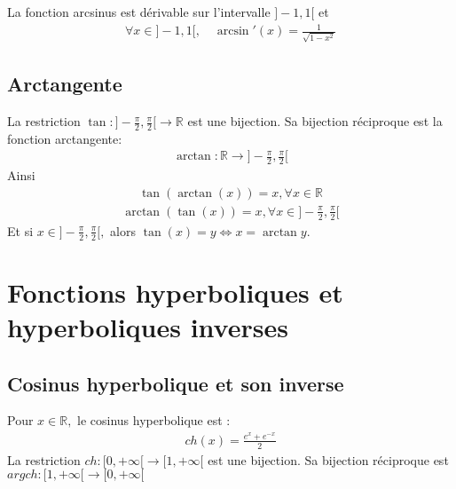 \documentclass[letterpaper,10pt,french]{jupyterBook}
\begin{document}
\sphinxAtStartPar
La fonction arcsinus est dérivable sur l’intervalle \(]-1,1[\) et
\begin{equation*}
\begin{split}
\forall x\in ]-1,1[,\quad \arcsin'(x)=\frac{1}{\sqrt{1-x^2}}
\end{split}
\end{equation*}

\subsection{Arctangente}
\label{\detokenize{fcthycerinvs:arctangente}}
\sphinxAtStartPar
La restriction \(\tan:]-\frac{\pi}{2},\frac{\pi}{2}[\rightarrow\mathbb{R}\) est une bijection. Sa bijection réciproque est la fonction arctangente:
\begin{equation*}
\begin{split}
\arctan:\mathbb{R}\rightarrow]-\frac{\pi}{2},\frac{\pi}{2}[
\end{split}
\end{equation*}
\sphinxAtStartPar
Ainsi
\begin{equation*}
\begin{split}
\tan(\arctan(x))=x,\forall x\in \mathbb{R}
\end{split}
\end{equation*}\begin{equation*}
\begin{split}
\arctan(\tan(x))=x, \forall x\in]-\frac{\pi}{2},\frac{\pi}{2}[
\end{split}
\end{equation*}
\sphinxAtStartPar
Et si \(x\in ]-\frac{\pi}{2},\frac{\pi}{2}[,\) alors \(\tan(x)=y\Leftrightarrow x=\arctan y.\)


\section{Fonctions hyperboliques et hyperboliques inverses}
\label{\detokenize{fcthycerinvs:fonctions-hyperboliques-et-hyperboliques-inverses}}

\subsection{Cosinus hyperbolique et son inverse}
\label{\detokenize{fcthycerinvs:cosinus-hyperbolique-et-son-inverse}}
\sphinxAtStartPar
Pour \(x\in \mathbb{R},\) le cosinus hyperbolique est :
\begin{equation*}
\begin{split}
ch(x)=\frac{e^x+e^{-x}}{2}
\end{split}
\end{equation*}
\sphinxAtStartPar
La restriction \(ch: [0,+\infty[\rightarrow[1,+\infty[\) est une bijection. Sa bijection réciproque est \(argch:[1,+\infty[\rightarrow[0,+\infty[\)
\end{document}
